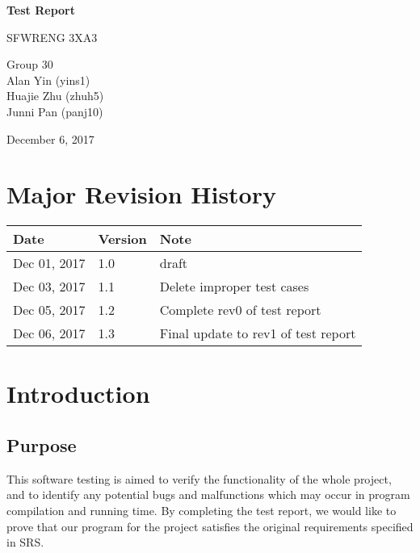 \documentclass[12pt]{article}
\begin{document}
\begin{titlepage}
    \begin{center}
        \vspace*{1cm}
        
        \Huge
        \textbf{Test Report}
        
        \vspace{0.5cm}
        \LARGE
        SFWRENG 3XA3
        
        \vspace{1.5cm}
        
\Large
        Group 30
		\\ Alan Yin (yins1)
		\\ Huajie Zhu (zhuh5)
		\\ Junni Pan (panj10)
        
        \vspace{1.5cm}
        
        \Large
        December 6, 2017
        
    \end{center}
\end{titlepage}
\newpage
\tableofcontents
\listoftables
\listoffigures


\newpage
\section{Major Revision History}
\begin{table}[h!]
\centering
\begin{tabular}{ | m{10em} | m{1.5cm}| m{5cm}|} 
\hline
Date & Version & Note \\ 
\hline
Dec 01, 2017 & 1.0 & draft \\ 
\hline
Dec 03, 2017 & 1.1 & Delete improper test cases \\ 
\hline
Dec 05, 2017 & 1.2 & Complete rev0 of test report \\ 
\hline
Dec 06, 2017 & 1.3 & Final update to rev1 of test report \\ 
\hline
\end{tabular}
\end{table}


\section{Introduction}
	\subsection{Purpose}
	This software testing is aimed to verify the functionality of the whole project, and to identify any potential bugs and malfunctions which may occur in program compilation and running time. By completing the test report, we would like to prove that our program for the project satisfies the original requirements specified in SRS.
\end{document}
